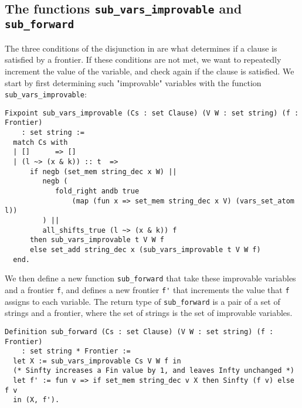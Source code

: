 \subsection{The functions \lstinline{sub_vars_improvable} and \lstinline{sub_forward}}

The three conditions of the disjunction in  are
what determines if a clause is satisfied by a frontier.
If these conditions are not met, we want to repeatedly increment the value of the variable,
and check again if the clause is satisfied.
We start by first determining such "improvable" variables with the function \lstinline{sub_vars_improvable}:

\begin{minipage}{\linewidth}
\begin{lstlisting}[language=Coq, label={lst:sub_vars_improvable_def}, caption={The function \lstinline{sub_vars_improvable}}]
Fixpoint sub_vars_improvable (Cs : set Clause) (V W : set string) (f : Frontier)
    : set string :=
  match Cs with
  | []      => []
  | (l ~> (x & k)) :: t  =>
      if negb (set_mem string_dec x W) ||
         negb (
            fold_right andb true
                (map (fun x => set_mem string_dec x V) (vars_set_atom l))
         ) ||
         all_shifts_true (l ~> (x & k)) f
      then sub_vars_improvable t V W f
      else set_add string_dec x (sub_vars_improvable t V W f)
  end.
\end{lstlisting}
\end{minipage}

We then define a new function \lstinline{sub_forward} that take these improvable variables
and a frontier \lstinline{f}, and defines a new frontier \lstinline{f'}
that increments the value that \lstinline{f} assigns to each variable.
The return type of \lstinline{sub_forward} is a pair of a set of strings and a frontier,
where the set of strings is the set of improvable variables.

\begin{minipage}{\linewidth}
\begin{lstlisting}[language=Coq, label={lst:sub_forward_def}, caption={The function \lstinline{sub_forward}}]
Definition sub_forward (Cs : set Clause) (V W : set string) (f : Frontier)
    : set string * Frontier :=
  let X := sub_vars_improvable Cs V W f in
  (* Sinfty increases a Fin value by 1, and leaves Infty unchanged *)
  let f' := fun v => if set_mem string_dec v X then Sinfty (f v) else f v
  in (X, f').
\end{lstlisting}
\end{minipage}

